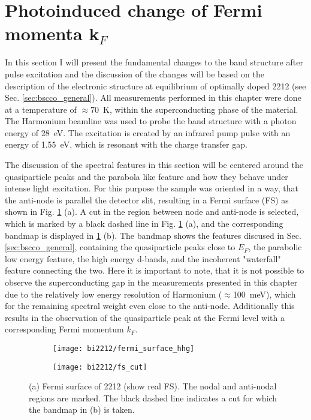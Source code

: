 \section{Photoinduced change of Fermi momenta k$_F$}
\label{sec:larger_effect}

In this section I will present the fundamental changes to the band structure after pulse excitation and the discussion of the changes will be based on the description of the electronic structure at equilibrium of optimally doped 2212 (see Sec. \ref{sec:bscco_general}).
All measurements performed in this chapter were done at a temperature of $\approx$\qty{70}{\kelvin}, within the superconducting phase of the material.
The Harmonium beamline \cite{arrell_harmonium_2017} was used to probe the band structure with a photon energy of \qty{28}{\electronvolt}.
The excitation is created by an infrared pump pulse with an energy of \qty{1.55}{\electronvolt}, which is resonant with the charge transfer gap.

The discussion of the spectral features in this section will be centered around the quasiparticle peaks and the parabola like feature and how they behave under intense light excitation.
For this purpose the sample was oriented in a way, that the anti-node is parallel the detector slit, resulting in a Fermi surface (FS) as shown in Fig. \ref{fig:fs_cut} (a).
A cut in the region between node and anti-node is selected, which is marked by a black dashed line in Fig. \ref{fig:fs_cut} (a), and the corresponding bandmap is displayed in \ref{fig:fs_cut} (b).
The bandmap shows the features discused in Sec. \ref{sec:bscco_general}, containing the quasiparticle peaks close to $E_F$, the parabolic low energy feature, the high energy  d-bands, and the incoherent "waterfall" feature connecting the two.
Here it is important to note, that it is not possible to observe the superconducting gap in the measurements presented in this chapter due to the relatively low energy resolution of Harmonium ($\approx$\qty{100}{\milli\electronvolt}), which for the remaining spectral weight even close to the anti-node.
Additionally this results in the observation of the quasiparticle peak at the Fermi level with a corresponding Fermi momentum $k_F$.

\begin{figure}[t]
	\centering
	\begin{subfigure}[b]{0.49\textwidth}
		\texttt{[image: bi2212/fermi\_surface\_hhg]}
		\caption{}
	\end{subfigure}
	\begin{subfigure}[b]{0.45\textwidth}
		\texttt{[image: bi2212/fs\_cut]}
		\caption{}
	\end{subfigure}
	\caption{(a) Fermi surface of 2212 (show real FS). The nodal and anti-nodal regions are marked. The black dashed line indicates a cut for which the bandmap in (b) is taken.}
	\label{fig:fs_cut}
\end{figure}

